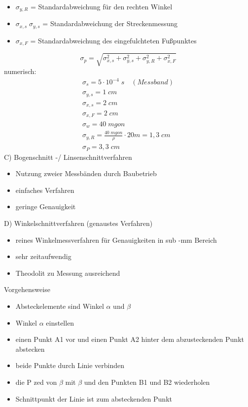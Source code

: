 \documentclass[12pt]{article}
\begin{document}
\begin{itemize}
\item $\sigma_{y,R}$ = Standardabweichung für den rechten Winkel
\item $\sigma_{x,s}\; \sigma_{y,s}$ = Standardabweichung der Streckenmessung
\item $\sigma_{x,F}$ = Standardabweichung des eingefulchteten Fußpunktes
\end{itemize}
\begin{equation*}
\sigma_p = \sqrt{\sigma^2_{x,s} + \sigma^2_{y,s} + \sigma^2_{y,R} + \sigma^2_{x,F}}
\end{equation*}
numerisch:
\begin{gather*}
\sigma_s = 5 \cdot 10^{-4} \; s \quad (Messband)\\
\sigma_{y,s} = 1\; cm \\
\sigma_{x,s} = 2\; cm \\
\sigma_{x,F} = 2\; cm \\
\sigma_w = 40 \; mgon \\
\sigma_{y,R} = \frac{40\; mgon}{\rho} \cdot 20m = 1,3\;cm \\
\sigma_P = 3,3\; cm
\end{gather*}
C) Bogenschnitt -/ Linsenschnittverfahren
\begin{itemize}
\item Nutzung zweier Messbänden durch Baubetrieb
\item einfaches Verfahren
\item geringe Genauigkeit
\end{itemize}
D) Winkelschnittverfahren (genaustes Verfahren)
\begin{itemize}
\item reines Winkelmessverfahren für Genauigkeiten in sub -mm Bereich
\item sehr zeitaufwendig
\item Theodolit zu Messung ausreichend
\end{itemize}
Vorgehensweise
\begin{itemize}
\item Absteckelemente sind Winkel $\alpha$ und $\beta$
\item Winkel $\alpha$ einstellen
\item einen Punkt A1 vor und einen Punkt A2 hinter dem abzusteckenden Punkt abstecken
\item beide Punkte durch Linie verbinden 
\item die P zed von $\beta$ mit $\beta$ und den Punkten B1 und B2 wiederholen
\item Schnittpunkt der Linie ist zum absteckenden Punkt
\end{itemize}
\end{document}
